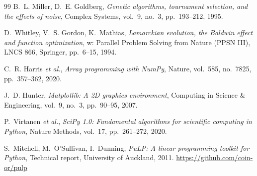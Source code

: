 \documentclass[12pt,a4paper]{article}
\begin{document}
\begin{thebibliography}{99}
B.~L. Miller, D.~E. Goldberg,
\textit{Genetic algorithms, tournament selection, and the effects of noise},
Complex Systems, vol.~9, no.~3, pp.~193--212, 1995.

D.~Whitley, V.~S. Gordon, K.~Mathias,
\textit{Lamarckian evolution, the Baldwin effect and function optimization},
w: Parallel Problem Solving from Nature (PPSN III), LNCS 866, Springer, pp.~6--15, 1994.

C.~R. Harris \textit{et al.},
\textit{Array programming with NumPy},
Nature, vol.~585, no.~7825, pp.~357--362, 2020.

J.~D. Hunter,
\textit{Matplotlib: A 2D graphics environment},
Computing in Science \& Engineering, vol.~9, no.~3, pp.~90--95, 2007.

P.~Virtanen \textit{et al.},
\textit{SciPy 1.0: Fundamental algorithms for scientific computing in Python},
Nature Methods, vol.~17, pp.~261--272, 2020.

S.~Mitchell, M.~O'Sullivan, I.~Dunning,
\textit{PuLP: A linear programming toolkit for Python},
Technical report, University of Auckland, 2011.
\url{https://github.com/coin-or/pulp}

\end{thebibliography}
\end{document}
